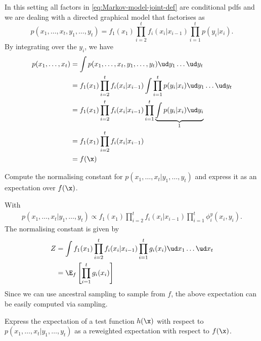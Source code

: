 \begin{exenumerate}
  \begin{solution}
    In this setting all factors in \eqref{eq:Markov-model-joint-def}
    are conditional pdfs and we are dealing with a directed graphical
    model that factorises as
    \begin{equation}
      p(x_1, \ldots, x_t, y_1, \ldots, y_t) = f_1(x_1) \prod_{i=2}^t f_i(x_i|x_{i-1}) \prod_{i=1}^t p(y_i|x_i).
    \end{equation}
    By integrating over the $y_i$, we have
    \begin{align}
      p(x_1, \ldots, x_t) &= \int p(x_1, \ldots, x_t, y_1, \ldots, y_t) \ud y_1 \ldots \ud y_t\\
      & = f_1(x_1) \prod_{i=2}^t f_i(x_i|x_{i-1}) \int \prod_{i=1}^t p(y_i|x_i) \ud y_1 \ldots \ud y_t\\
      & = f_1(x_1) \prod_{i=2}^t f_i(x_i|x_{i-1}) \prod_{i=1}^t \underbrace{\int  p(y_i|x_i) \ud y_i}_{1}\\
      & = f_1(x_1) \prod_{i=2}^t f_i(x_i|x_{i-1})\\
      & = f(\x)
    \end{align}
    
  \end{solution}
  
  
\item Compute the normalising constant for $p(x_1, \ldots, x_t | y_1, \ldots, y_t)$ and express it as an expectation over $f(\x)$.
  \begin{solution}
    With
    \begin{align}
      p(x_1, \ldots, x_t | y_1, \ldots, y_t) \propto f_1(x_1) \prod_{i=2}^t f_i(x_i|x_{i-1}) \prod_{i=1}^t \phi_i^y(x_i, y_i).
    \end{align}
    The normalising constant is given by
    \begin{align}
      Z & = \int f_1(x_1) \prod_{i=2}^t f_i(x_i|x_{i-1})\prod_{i=1}^t g_i(x_i) \ud x_1 \ldots \ud x_t\\
      & = \E_f\left [\prod_{i=1}^t g_i(x_i) \right]
    \end{align}
    Since we can use ancestral sampling to sample from $f$, the
    above expectation can be easily computed via sampling.    
    
  \end{solution}

\item Express the expectation of a test function $h(\x)$ with respect
  to $p(x_1, \ldots, x_t | y_1, \ldots, y_t)$ as a reweighted
  expectation with respect to $f(\x)$.


\end{exenumerate}
